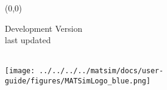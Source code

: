 \begin{titlepage}
\makeatletter
\pagestyle{empty}


\makebox(0,0){} %
\vspace{3cm}
\par
\raggedright
{\textcolor{Medium}{\fontsize{45}{60}\sffamily\bfseries \@title}}\par
\vspace{1cm}
{\textcolor{Medium}{\titleFontSmall Development Version\\last updated \@date}}\par
\vspace{15cm}
{\titleFontSmall \mdseries\par\@author}\\
\vspace{2cm}
\raggedleft
\texttt{[image: ../../../../matsim/docs/user-guide/figures/MATSimLogo\_blue.png]}

\makeatother
\end{titlepage}
